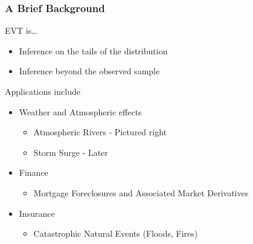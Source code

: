 \documentclass[aspectratio=169,10pt,notes]{beamer}
\begin{document}
\begin{frame}
    \frametitle{A Brief Background}
    \begin{minipage}{0.64\textwidth}
    EVT is\ldots
    \begin{itemize}
        \item Inference on the tails of the distribution
        \item Inference beyond the observed sample
    \end{itemize}
    Applications include
    \begin{itemize}
        \item Weather and Atmospheric effects
        \begin{itemize}
            \item Atmospheric Rivers - Pictured right
            \item Storm Surge - Later
        \end{itemize}
        \item Finance
        \begin{itemize}
            \item Mortgage Foreclosures and Associated Market Derivatives
        \end{itemize}
        \item Insurance
        \begin{itemize}
            \item Catastrophic Natural Events (Floods, Fires)
        \end{itemize}
    \end{itemize}
    \end{minipage} %
    \begin{minipage}{.35\textwidth}
    \centering

\end{minipage}
\end{frame}
\end{document}
